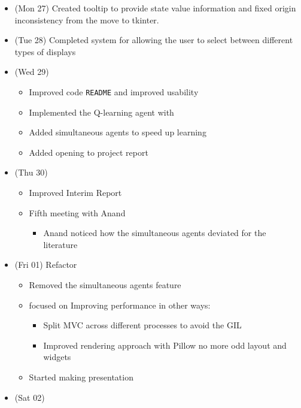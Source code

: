 \begin{itemize}
  \tightlist
  \item
        (Mon 27) Created tooltip to provide state value information and fixed
        origin inconsistency from the move to tkinter.
  \item
        (Tue 28) Completed system for allowing the user to select between
        different types of displays
  \item
        (Wed 29)

        \begin{itemize}
          \tightlist
          \item
                Improved code \texttt{README} and improved usability
          \item
                Implemented the Q-learning agent with
          \item
                Added simultaneous agents to speed up learning
          \item
                Added opening to project report
        \end{itemize}
  \item
        (Thu 30)

        \begin{itemize}
          \tightlist
          \item
                Improved Interim Report
          \item
                Fifth meeting with Anand

                \begin{itemize}
                  \tightlist
                  \item
                        Anand noticed how the simultaneous agents deviated for the
                        literature
                \end{itemize}
        \end{itemize}
  \item
        (Fri 01) Refactor

        \begin{itemize}
          \tightlist
          \item
                Removed the simultaneous agents feature
          \item
                focused on Improving performance in other ways:

                \begin{itemize}
                  \tightlist
                  \item
                        Split MVC across different processes to avoid the GIL
                  \item
                        Improved rendering approach with Pillow no more odd layout and
                        widgets
                \end{itemize}
          \item
                Started making presentation
        \end{itemize}
  \item
        (Sat 02)


\end{itemize}
